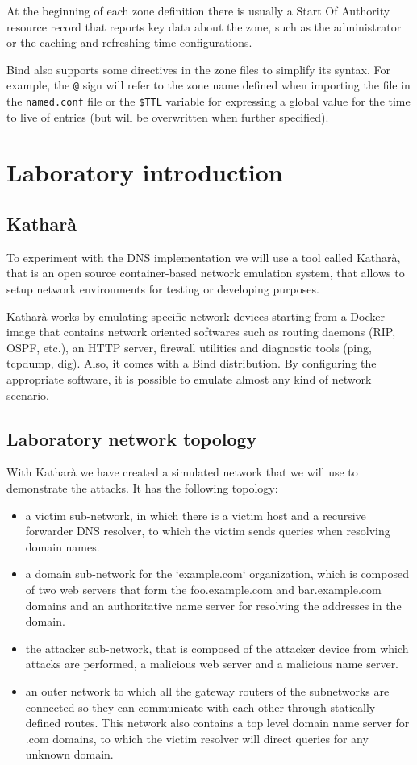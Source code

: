 \documentclass[11pt,a4paper]{article}
\begin{document}
\noindent
At the beginning of each zone definition there is usually a Start Of Authority resource record that reports key data about the zone, such as the administrator or the caching and refreshing time configurations.

\noindent
Bind also supports some directives in the zone files to simplify its syntax. For example, the \texttt{@} sign will refer to the zone name defined when importing the file in the \texttt{named.conf} file or the \texttt{\$TTL} variable for expressing a global value for the time to live of entries (but will be overwritten when further specified).

\section{Laboratory introduction}

\subsection{Katharà}
To experiment with the DNS implementation we will use a tool called Katharà, that is an open source container-based network emulation system, that allows to setup network environments for testing or developing purposes.

\noindent
Katharà works by emulating specific network devices starting from a Docker image that contains network oriented softwares such as routing daemons (RIP, OSPF, etc.), an HTTP server, firewall utilities and diagnostic tools (ping, tcpdump, dig). Also, it comes with a Bind distribution.
By configuring the appropriate software, it is possible to emulate almost any kind of network scenario.

\subsection{Laboratory network topology}

With Katharà we have created a simulated network that we will use to demonstrate the attacks. It has the following topology:
\begin{itemize}
\item a victim sub-network, in which there is a victim host and a recursive forwarder DNS resolver, to which the victim sends queries when resolving domain names.
\item a domain sub-network for the `example.com` organization, which is composed of two web servers that form the foo.example.com and bar.example.com domains and an authoritative name server for resolving the addresses in the domain.
\item the attacker sub-network, that is composed of the attacker device from which attacks are performed, a malicious web server and a malicious name server.
\item an outer network to which all the gateway routers of the subnetworks are connected so they can communicate with each other through statically defined routes. This network also contains a top level domain name server for .com domains, to which the victim resolver will direct queries for any unknown domain.
\end{itemize}
\end{document}
